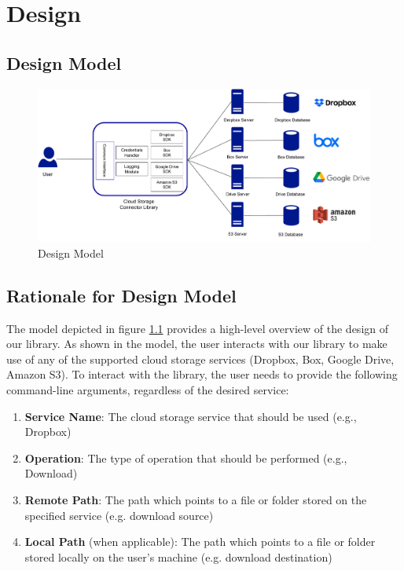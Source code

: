 \chapter{Design}

\section{Design Model}

\begin{figure} [h]
	\centering
	\includegraphics[scale=0.55]{images/design_diagram}
	\caption{\label{fig:design_model}Design Model}
\end{figure}

\section{Rationale for Design Model}
The model depicted in figure \ref{fig:design_model} provides a high-level overview of the design of our library. As shown in the model, the user interacts with our library to make use of any of the supported cloud storage services (Dropbox, Box, Google Drive, Amazon S3). To interact with the library, the user needs to provide the following command-line arguments, regardless of the desired service:

\begin{enumerate}
	\item \textbf{Service Name}: The cloud storage service that should be used (e.g., Dropbox)
	
	\item \textbf{Operation}: The type of operation that should be performed (e.g., Download)
	
	\item \textbf{Remote Path}: The path which points to a file or folder stored on the specified service (e.g. download source)
	
	\item \textbf{Local Path} (when applicable): The path which points to a file or folder stored locally on the user's machine (e.g. download destination)
\end{enumerate}

